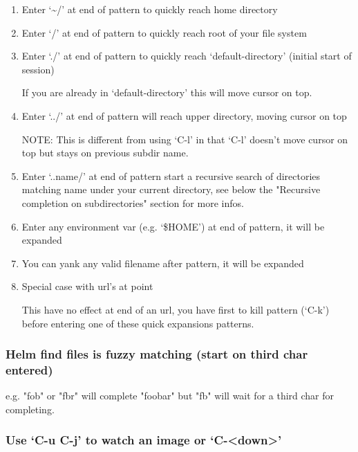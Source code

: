 \documentclass[11pt]{article}
\begin{document}
\begin{enumerate}
\item Enter ‘\textasciitilde{}/’ at end of pattern to quickly reach home directory
\label{sec:org4d827e8}

\item Enter ‘/’ at end of pattern to quickly reach root of your file system
\label{sec:org3a942c7}

\item Enter ‘./’ at end of pattern to quickly reach ‘default-directory’ (initial start of session)
\label{sec:orgca3e199}

If you are already in ‘default-directory’ this will move cursor on top.

\item Enter ‘../’ at end of pattern will reach upper directory, moving cursor on top
\label{sec:org7098469}

NOTE: This is different from using ‘C-l’ in that ‘C-l’ doesn’t move cursor on top but stays on previous
subdir name.

\item Enter ‘..name/’ at end of pattern start a recursive search of directories matching name under
\label{sec:org12bf978}
your current directory, see below the "Recursive completion on subdirectories" section for more infos.

\item Enter any environment var (e.g. ‘\$HOME’) at end of pattern, it will be expanded
\label{sec:org4a40fe0}

\item You can yank any valid filename after pattern, it will be expanded
\label{sec:orgb491369}

\item Special case with url’s at point
\label{sec:org78a88c1}

This have no effect at end of an url, you have first to kill pattern (‘C-k’)
before entering one of these quick expansions patterns.
\end{enumerate}

\subsubsection{Helm find files is fuzzy matching (start on third char entered)}
\label{sec:orgdb7ae2d}

e.g. "fob" or "fbr" will complete "foobar"
but "fb" will wait for a third char for completing.

\subsubsection{Use ‘C-u C-j’ to watch an image or ‘C-<down>’}
\label{sec:org4999aa9}
\end{document}
